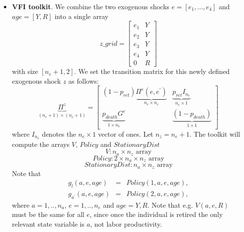 \documentclass[12pt]{article}
\begin{document}
\begin{itemize}
\item \textbf{VFI toolkit}. We combine the two exogenous shocks $e=\left[
e_{1},\ldots ,e_{4}\right] $ and $age=[Y,R]$ into a single array%
\begin{equation*}
z\_grid=%
\begin{bmatrix}
e_{1} & Y \\ 
e_{2} & Y \\ 
e_{3} & Y \\ 
e_{4} & Y \\ 
0 & R%
\end{bmatrix}%
\end{equation*}
with size $[n_{e}+1,2]$. We set the transition matrix for this newly defined
exogenous shock $z$ as follows:%
\begin{equation*}
\underbrace{\Pi ^{z}}_{(n_{e}+1)\times (n_{e}+1)}=%
\begin{bmatrix}
\left( 1-p_{ret}\right) \underbrace{\Pi ^{e}(e,e^{\prime })}_{n_{e}\times
n_{e}} & \underbrace{p_{ret}I_{n_{e}}}_{n_{e}\times 1} \\ 
\underbrace{p_{death}G^{e}}_{1\times n_{e}} & \underbrace{\left(
1-p_{death}\right) }_{1\times 1}%
\end{bmatrix}%
\end{equation*}%
where $I_{n_{e}}$ denotes the $n_{e}\times 1$ vector of ones. Let $%
n_{z}=n_{e}+1$. The toolkit will compute the arrays $V$, $Policy$ and $%
StationaryDist$%
\begin{equation*}
V:n_{a}\times n_{z}\text{ array}
\end{equation*}%
\begin{equation*}
Policy:2\times n_{a}\times n_{z}\text{ array}
\end{equation*}%
\begin{equation*}
StationaryDist:n_{a}\times n_{z}\text{ array}
\end{equation*}%
Note that 
\begin{eqnarray*}
g_{l}(a,e,age) &=&Policy(1,a,e,age), \\
g_{a^{\prime }}(a,e,age) &=&Policy(2,a,e,age),
\end{eqnarray*}%
where $a=1,..,n_{a}$, $e=1,..,n_{e}$ and $age=Y,R$. Note that e.g. $V(a,e,R)$
must be the same for all $e$, since once the individual is retired the only
relevant state variable is $a$, not labor productivity.
\end{itemize}
\end{document}
